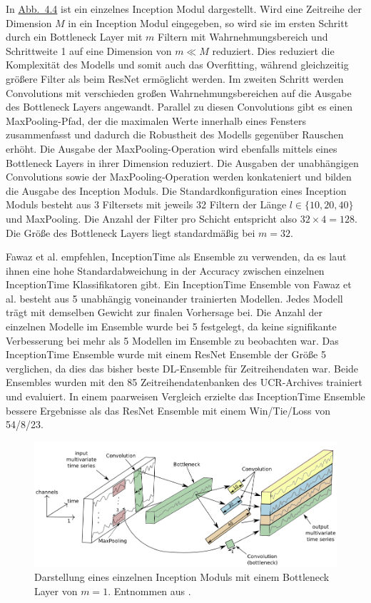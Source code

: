 In \hyperref[fig:InceptionModul]{Abb.~4.4} ist ein einzelnes Inception Modul dargestellt. Wird eine Zeitreihe der Dimension $M$ in ein Inception Modul eingegeben, so wird sie im ersten Schritt durch ein Bottleneck Layer mit $m$ Filtern mit Wahrnehmungsbereich und Schrittweite 1 auf eine Dimension von $m \ll M$ reduziert. Dies reduziert die Komplexität des Modells und somit auch das Overfitting, während gleichzeitig größere Filter als beim \gls{ResNet} ermöglicht werden. 
Im zweiten Schritt werden Convolutions mit verschieden großen Wahrnehmungsbereichen auf die Ausgabe des Bottleneck Layers angewandt. Parallel zu diesen Convolutions gibt es einen MaxPooling-Pfad, der die maximalen Werte innerhalb eines Fensters zusammenfasst und dadurch die Robustheit des Modells gegenüber Rauschen erhöht. Die Ausgabe der MaxPooling-Operation wird ebenfalls mittels eines Bottleneck Layers in ihrer Dimension reduziert. Die Ausgaben der unabhängigen Convolutions sowie der MaxPooling-Operation werden konkateniert und bilden die Ausgabe des Inception Moduls.
Die Standardkonfiguration eines Inception Moduls besteht aus 3 Filtersets mit jeweils 32 Filtern der Länge $l \in \{10, 20, 40\}$ und MaxPooling. Die Anzahl der Filter pro Schicht entspricht also $32 \times 4=128$. Die Größe des Bottleneck Layers liegt standardmäßig bei $m=32$. \cite{fawaz_inceptiontime_2020} 

Fawaz et al. empfehlen, InceptionTime als Ensemble zu verwenden, da es laut ihnen eine hohe Standardabweichung in der Accuracy zwischen einzelnen InceptionTime Klassifikatoren gibt. Ein InceptionTime Ensemble von Fawaz et al. besteht aus 5 unabhängig voneinander trainierten Modellen. Jedes Modell trägt mit demselben Gewicht zur finalen Vorhersage bei. Die Anzahl der einzelnen Modelle im Ensemble wurde bei 5 festgelegt, da keine signifikante Verbesserung bei mehr als 5 Modellen im Ensemble zu beobachten war.
Das InceptionTime Ensemble wurde mit einem \gls{ResNet} Ensemble der Größe 5 verglichen, da dies das bisher beste \gls{DL}-Ensemble für Zeitreihendaten war. Beide Ensembles wurden mit den 85 Zeitreihendatenbanken des UCR-Archives trainiert und evaluiert. In einem paarweisen Vergleich erzielte das InceptionTime Ensemble bessere Ergebnisse als das \gls{ResNet} Ensemble mit einem Win/Tie/Loss von 54/8/23. \cite{fawaz_inceptiontime_2020}

\begin{figure}[!ht]%
\centering
	\includegraphics[width=1\textwidth]{./Bilder/InceptionModul.png}
\caption[Darstellung eines einzelnen Inception Moduls]{Darstellung eines einzelnen Inception Moduls mit einem Bottleneck Layer von $m=1$. Entnommen aus \cite{fawaz_inceptiontime_2020}.} 
\label{fig:InceptionModul}
\end{figure} 


